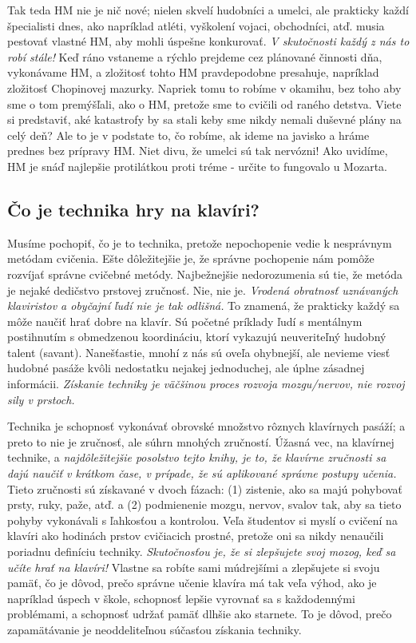 Tak teda HM nie je nič nové; nielen skvelí hudobníci a umelci, ale prakticky každí špecialisti dnes, ako napríklad atléti, vyškolení vojaci, obchodníci, atď. musia pestovať vlastné HM, aby mohli úspešne konkurovať. \emph{V skutočnosti každý z nás to robí stále!} Keď ráno vstaneme a rýchlo prejdeme cez plánované činnosti dňa, vykonávame HM, a zložitosť tohto HM pravdepodobne presahuje, napríklad zložitosť Chopinovej mazurky. Napriek tomu to robíme v okamihu, bez toho aby sme o tom premýšľali, ako o HM, pretože sme to cvičili od raného detstva. Viete si predstaviť, aké katastrofy by sa stali keby sme nikdy nemali duševné plány na celý deň? Ale to je v podstate to, čo  robíme, ak ideme na javisko a hráme prednes bez prípravy HM. Niet divu, že umelci sú tak nervózni! Ako uvidíme, HM je snáď najlepšie protilátkou proti tréme - určite to fungovalo u Mozarta.

\subsection{Čo je technika hry na klavíri?}
Musíme pochopiť, čo je to technika, pretože nepochopenie vedie k nesprávnym metódam cvičenia. Ešte dôležitejšie je, že správne pochopenie nám pomôže rozvíjať správne cvičebné metódy. Najbežnejšie nedorozumenia sú tie, že metóda je nejaké dedičstvo prstovej zručnosť. Nie, nie je. \emph{Vrodená obratnosť uznávaných klaviristov a obyčajní ľudí nie je tak odlišná.} To znamená, že prakticky každý sa môže naučiť hrať dobre na klavír. Sú početné príklady ľudí s mentálnym postihnutím s obmedzenou koordináciu, ktorí vykazujú neuveriteľný hudobný talent (savant). Nanešťastie, mnohí z nás sú oveľa ohybnejší, ale nevieme viesť hudobné pasáže kvôli nedostatku nejakej jednoduchej, ale úplne zásadnej informácii. \emph{Získanie techniky je väčšinou proces rozvoja mozgu/nervov, nie rozvoj sily v prstoch.}

Technika je schopnosť vykonávať obrovské množstvo rôznych klavírnych pasáží; a preto to nie je zručnosť, ale súhrn mnohých zručností. Úžasná vec, na klavírnej technike, a \emph{najdôležitejšie posolstvo tejto knihy, je to, že klavírne zručnosti sa dajú naučiť v krátkom čase, v prípade, že sú aplikované správne postupy učenia.} Tieto zručnosti sú získavané v dvoch fázach: (1) zistenie, ako sa majú pohybovať prsty, ruky, paže, atď. a (2) podmienenie mozgu, nervov, svalov tak, aby sa tieto pohyby  vykonávali s ľahkosťou a kontrolou. Veľa študentov si myslí o cvičení na klavíri ako hodinách prstov cvičiacich prostné, pretože oni sa nikdy nenaučili poriadnu definíciu techniky. \emph{Skutočnosťou je, že si zlepšujete svoj mozog, keď sa učíte hrať na klavíri!} Vlastne sa robíte sami múdrejšími a zlepšujete si svoju pamäť, čo je dôvod, prečo správne učenie klavíra má tak veľa výhod, ako je napríklad úspech v škole, schopnosť lepšie vyrovnať sa s každodennými problémami, a schopnosť udržať pamäť dlhšie ako starnete. To je dôvod, prečo zapamätávanie je neoddeliteľnou súčasťou získania techniky.

